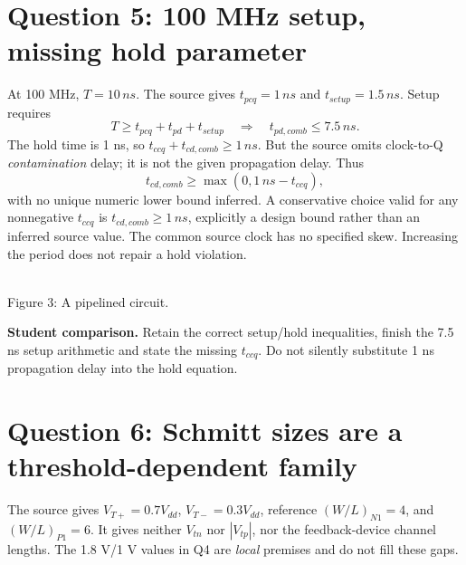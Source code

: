 \documentclass[10pt]{article}
\begin{document}
\newpage\section*{Question 5: 100 MHz setup, missing hold parameter}
At 100 MHz, $T=10\,ns$. The source gives $t_{pcq}=1\,ns$ and $t_{setup}=1.5\,ns$. Setup requires
\[T\ge t_{pcq}+t_{pd}+t_{setup}\quad\Longrightarrow\quad
\boxed{t_{pd,comb}\le7.5\,ns.}\]
The hold time is 1 ns, so $t_{ccq}+t_{cd,comb}\ge1\,ns$. But the source omits clock-to-Q \emph{contamination} delay; it is not the given propagation delay. Thus
\[\boxed{t_{cd,comb}\ge\max(0,1\,ns-t_{ccq}),}\]
with no unique numeric lower bound inferred. A conservative choice valid for any nonnegative $t_{ccq}$ is $t_{cd,comb}\ge1\,ns$, explicitly a design bound rather than an inferred source value. The common source clock has no specified skew. Increasing the period does not repair a hold violation.
\begin{center}\\Figure 3: A pipelined circuit.\end{center}
\textbf{Student comparison.} Retain the correct setup/hold inequalities, finish the 7.5 ns setup arithmetic and state the missing $t_{ccq}$. Do not silently substitute 1 ns propagation delay into the hold equation.

\section*{Question 6: Schmitt sizes are a threshold-dependent family}
The source gives $V_{T+}=0.7V_{dd}$, $V_{T-}=0.3V_{dd}$, reference $(W/L)_{N1}=4$, and $(W/L)_{P1}=6$. It gives neither $V_{tn}$ nor $|V_{tp}|$, nor the feedback-device channel lengths. The 1.8 V/1 V values in Q4 are \emph{local} premises and do not fill these gaps.
\end{document}
